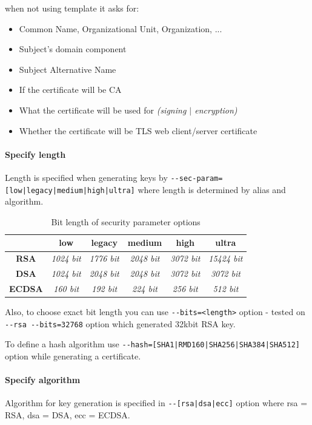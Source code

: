 \documentclass[10pt, a4paper]{report}
\begin{document}
when not using template it asks for:
\begin{itemize}
\item Common Name, Organizational Unit, Organization, ...
\item Subject's domain component
\item Subject Alternative Name
\item If the certificate will be CA
\item What the certificate will be used for \textit{(signing $\vert$ encryption)}
\item Whether the certificate will be TLS web client/server certificate
\end{itemize}

\pagebreak

      \paragraph{Specify length}

Length is specified when generating keys by \verb+--sec-param=[low|legacy|medium|high|ultra]+ where length is determined by alias and algorithm.

\begin{table}[]
\centering
\caption{Bit length of security parameter options}
\label{my-label}
\begin{tabular}{|c|c|c|c|c|c|}
\hline
               & \textbf{low}      & \textbf{legacy}   & \textbf{medium}   & \textbf{high}     & \textbf{ultra}     \\ \hline
\textbf{RSA}   & \textit{1024 bit} & \textit{1776 bit} & \textit{2048 bit} & \textit{3072 bit} & \textit{15424 bit} \\ \hline
\textbf{DSA}   & \textit{1024 bit} & \textit{2048 bit} & \textit{2048 bit} & \textit{3072 bit} & \textit{3072 bit}  \\ \hline
\textbf{ECDSA} & \textit{160 bit}  & \textit{192 bit}  & \textit{224 bit}  & \textit{256 bit}  & \textit{512 bit}   \\ \hline
\end{tabular}
\end{table}

Also, to choose exact bit length you can use \verb+--bits=<length>+ option - tested on \verb+--rsa --bits=32768+ option which generated 32kbit RSA key.

To define a hash algorithm use \verb+--hash=[SHA1|RMD160|SHA256|SHA384|SHA512]+ option while generating a certificate.

      \paragraph{Specify algorithm}
Algorithm for key generation is specified in \verb+--[rsa|dsa|ecc]+ option where rsa = RSA, dsa = DSA, ecc = ECDSA.
    
\end{document}
